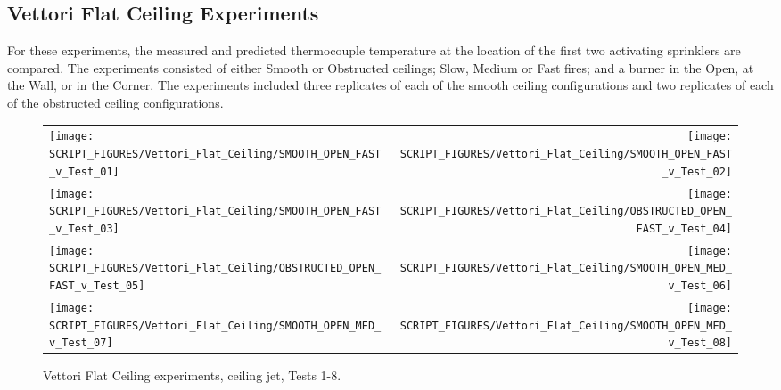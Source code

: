 \clearpage

\subsection{Vettori Flat Ceiling Experiments}
\label{Vettori_Flat_Results}

For these experiments, the measured and predicted thermocouple temperature at the location of the first two activating sprinklers are compared. The experiments consisted of either Smooth or Obstructed ceilings; Slow, Medium or Fast fires; and a burner in the Open, at the Wall, or in the Corner.
The experiments included three replicates of each of the smooth ceiling configurations and two replicates of each of the obstructed ceiling configurations.

\newpage

\begin{figure}[p]
\begin{tabular*}{\textwidth}{l@{\extracolsep{\fill}}r}
\texttt{[image: SCRIPT\_FIGURES/Vettori\_Flat\_Ceiling/SMOOTH\_OPEN\_FAST\_v\_Test\_01]} &
\texttt{[image: SCRIPT\_FIGURES/Vettori\_Flat\_Ceiling/SMOOTH\_OPEN\_FAST\_v\_Test\_02]} \\
\texttt{[image: SCRIPT\_FIGURES/Vettori\_Flat\_Ceiling/SMOOTH\_OPEN\_FAST\_v\_Test\_03]} &
\texttt{[image: SCRIPT\_FIGURES/Vettori\_Flat\_Ceiling/OBSTRUCTED\_OPEN\_FAST\_v\_Test\_04]} \\
\texttt{[image: SCRIPT\_FIGURES/Vettori\_Flat\_Ceiling/OBSTRUCTED\_OPEN\_FAST\_v\_Test\_05]} &
\texttt{[image: SCRIPT\_FIGURES/Vettori\_Flat\_Ceiling/SMOOTH\_OPEN\_MED\_v\_Test\_06]} \\
\texttt{[image: SCRIPT\_FIGURES/Vettori\_Flat\_Ceiling/SMOOTH\_OPEN\_MED\_v\_Test\_07]} &
\texttt{[image: SCRIPT\_FIGURES/Vettori\_Flat\_Ceiling/SMOOTH\_OPEN\_MED\_v\_Test\_08]} \\
\end{tabular*}
\caption[Vettori Flat Ceiling experiments, ceiling jet, Tests 1-8]{Vettori Flat Ceiling experiments, ceiling jet, Tests 1-8.}
\label{Vettori_1}
\end{figure}


